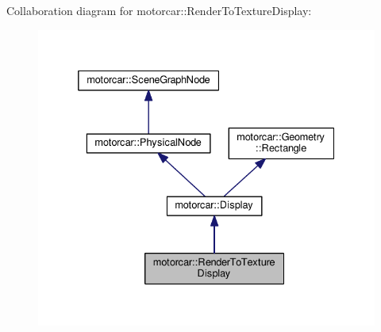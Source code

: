 Collaboration diagram for motorcar\-:\-:Render\-To\-Texture\-Display\-:
\nopagebreak
\begin{figure}[H]
\begin{center}
\leavevmode
\includegraphics[width=332pt]{classmotorcar_1_1RenderToTextureDisplay__coll__graph}
\end{center}
\end{figure}
